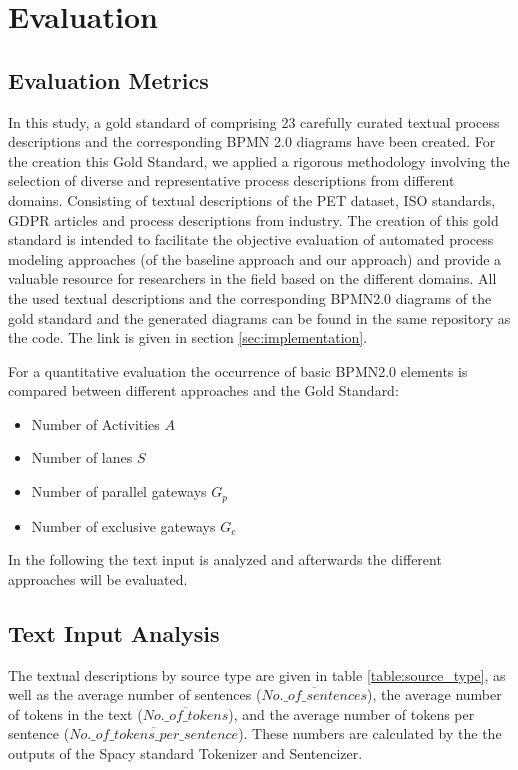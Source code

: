 \chapter{Evaluation}
\label{sec:evaluation}
\section{Evaluation Metrics}
In this study, a gold standard of comprising 23 carefully curated textual process descriptions and the corresponding BPMN 2.0 diagrams have been created.  For the creation this Gold Standard, we applied a rigorous methodology involving the selection of diverse and representative process descriptions from different domains.  Consisting of textual descriptions of the PET dataset, ISO standards, GDPR articles and process descriptions from industry. The creation of this gold standard is intended to facilitate the objective evaluation of automated process modeling approaches (of the baseline approach and our approach) and provide a valuable resource for researchers in the field based on the different domains. All the used textual descriptions and the corresponding BPMN2.0 diagrams of the gold standard and the generated diagrams can be found in the same repository as the code. The link is given in section \ref{sec:implementation}. 

For a quantitative evaluation the occurrence of basic BPMN2.0 elements is compared between different approaches and the Gold Standard:
\begin{itemize}
    \item Number of Activities $A$
    \item Number of lanes $S$
    \item Number of parallel gateways $G_p$
    \item Number of exclusive gateways $G_e$
\end{itemize}

In the following the text input is analyzed and afterwards the different approaches will be evaluated.

\newpage
\section{Text Input Analysis}
The textual descriptions by source type are given in table \ref{table:source_type}, as well as the average number of sentences ($\overline{No.\_of\_sentences}$), the average number of tokens in the text ($\overline{No.\_of\_tokens}$), and the average number of tokens per sentence ($\overline{No.\_of\_tokens\_per\_sentence}$). These numbers are calculated by the the outputs of the Spacy standard Tokenizer and Sentencizer.

